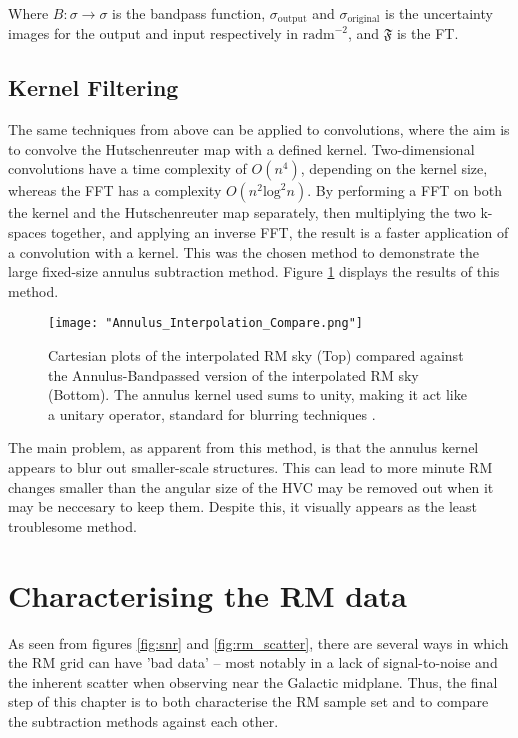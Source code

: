 Where $B\colon\sigma\rightarrow\sigma$ is the bandpass function, $\sigma_{\mathrm{output}}$ and $\sigma_{\mathrm{original}}$ is the uncertainty images for the output and input respectively in $\mathrm{rad m}^{-2}$, and $\mathbf{\mathfrak{F}}$ is the FT.

\subsection{Kernel Filtering}
\label{ssec:kernel}

The same techniques from above can be applied to convolutions, where the aim is to convolve the Hutschenreuter map with a defined kernel. Two-dimensional convolutions have a time complexity of $O(n^4)$, depending on the kernel size, whereas the FFT has a complexity $O(n^2 \mathrm{log}^2 n)$. By performing a FFT on both the kernel and the Hutschenreuter map separately, then multiplying the two k-spaces together, and applying an inverse FFT, the result is a faster application of a convolution with a kernel. This was the chosen method to demonstrate the large fixed-size annulus subtraction method. Figure \ref{fig:annulus_interpolation} displays the results of this method.

\begin{figure}
    \texttt{[image: "Annulus\_Interpolation\_Compare.png"]}
    \centering
    \caption{Cartesian plots of the interpolated RM sky (Top) compared against the Annulus-Bandpassed version of the interpolated RM sky (Bottom). The annulus kernel used sums to unity, making it act like a unitary operator, standard for blurring techniques \citep{ID38}.}
    \label{fig:annulus_interpolation}
\end{figure}

The main problem, as apparent from this method, is that the annulus kernel appears to blur out smaller-scale structures. This can lead to more minute RM changes smaller than the angular size of the HVC may be removed out when it may be neccesary to keep them. Despite this, it visually appears as the least troublesome method.

\section{Characterising the RM data}
\label{sec:charm}

As seen from figures \ref{fig:snr} and \ref{fig:rm_scatter}, there are several ways in which the RM grid can have 'bad data' – most notably in a lack of signal-to-noise and the inherent scatter when observing near the Galactic midplane. Thus, the final step of this chapter is to both characterise the RM sample set and to compare the subtraction methods against each other.


